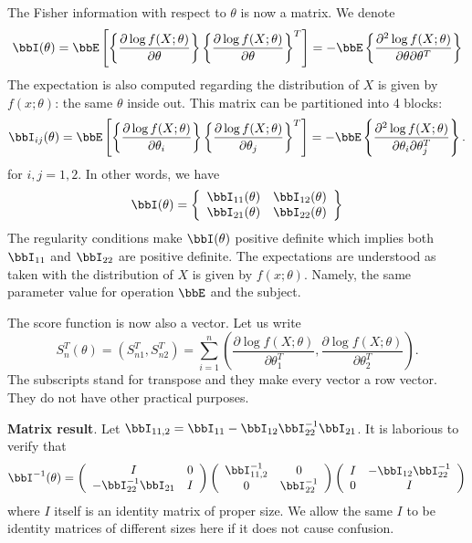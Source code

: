The Fisher information with respect to $\theta$ is now a matrix.
We denote
\[
\bbI (\theta) 
= \bbE \left [ \left \{ \frac{\partial \log f(X; \theta)}{\partial \theta} \right \} 
\left \{ \frac{\partial \log f(X; \theta)}{\partial \theta} \right \}^T \right ]
=
- \bbE \left \{ \frac{\partial^2 \log f(X; \theta)}{\partial \theta \partial \theta^T} \right \}
\]
The expectation is also computed regarding the distribution of $X$
is given by $f(x; \theta)$: the same $\theta$ inside out.
This matrix can be partitioned into 4 blocks:
\[
\bbI_{ij} (\theta) = 
\bbE \left [ \left \{ \frac{\partial \log f(X; \theta)}{\partial \theta_i} \right \} 
\left \{ \frac{\partial \log f(X; \theta)}{\partial \theta_j} \right \}^T \right ]
=
- \bbE \left \{ \frac{\partial^2 \log f(X; \theta)}{\partial \theta_i \partial \theta_j^T} \right \}.
\]
for $i,  j = 1, 2$.
In other words, we have
\[
\bbI(\theta) = 
\left \{
\begin{array}{cc}
\bbI_{11}(\theta) & \bbI_{12} (\theta)\\
\bbI_{21}(\theta) & \bbI_{22}(\theta)
\end{array}
\right \}
\]
The regularity conditions make $\bbI(\theta)$ positive definite which implies
both $\bbI_{11}$ and $\bbI_{22}$ are positive definite. The expectations are
understood as taken with the distribution of $X$ is given by $f(x; \theta)$.
Namely, the same parameter value for operation $\bbE$ and the
subject.

The score function is now also a vector. Let us write
\[
S^T_n(\theta) = (S^T_{n1}, S^T_{n2})
 = 
 \sum_{i=1}^n \left ( \frac{\partial \log f(X; \theta)}{\partial \theta^T_1}, 
 \frac{\partial \log f(X; \theta)}{\partial \theta^T_2} \right ).
\]
The subscripts stand for transpose and they make every vector a row vector.
They do not have other practical purposes.

\vs
{\bf Matrix result}.  Let $\bbI_{11,2} = \bbI_{11}- \bbI_{12} \bbI_{22}^{-1} \bbI_{21}$.
It is laborious to verify that 
\[
\bbI^{-1}(\theta) =
\left (
\begin{array}{cc}
I & 0\\
-\bbI_{22}^{-1}\bbI_{21} & I
\end{array} \right )
\left (
\begin{array}{cc}
\bbI^{-1}_{11,2} & 0\\
0& \bbI_{22}^{-1}
\end{array} \right )
\left (
\begin{array}{cc}
I & -\bbI_{12} \bbI_{22}^{-1}\\
0 & I
\end{array} \right )
\]
where $I$ itself is an identity matrix of proper size.
We allow the same $I$ to be identity matrices of
different sizes here if it does not cause confusion.

